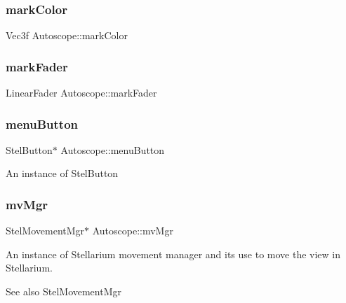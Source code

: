 \subsubsection{\texorpdfstring{markColor}{markColor}}
{\footnotesize\ttfamily Vec3f Autoscope\+::mark\+Color\hspace{0.3cm}{\ttfamily [private]}}

\mbox{\label{class_autoscope_a9c141894e06ed64f4131f1071e9e18af}} 
\subsubsection{\texorpdfstring{markFader}{markFader}}
{\footnotesize\ttfamily Linear\+Fader Autoscope\+::mark\+Fader\hspace{0.3cm}{\ttfamily [private]}}

\mbox{\label{class_autoscope_a5b14962697fbd8fffac986df08aee611}} 
\subsubsection{\texorpdfstring{menuButton}{menuButton}}
{\footnotesize\ttfamily Stel\+Button$\ast$ Autoscope\+::menu\+Button\hspace{0.3cm}{\ttfamily [private]}}

An instance of Stel\+Button \mbox{\label{class_autoscope_ab34124a1179a937ac061bb4fa3faa2de}} 
\subsubsection{\texorpdfstring{mvMgr}{mvMgr}}
{\footnotesize\ttfamily Stel\+Movement\+Mgr$\ast$ Autoscope\+::mv\+Mgr}



An instance of Stellarium movement manager and it\textquotesingle{}s use to move the view in Stellarium. 

\begin{DoxySeeAlso}{See also}
Stel\+Movement\+Mgr 
\end{DoxySeeAlso}
\mbox{\label{class_autoscope_aa02f096fc07e27ef3843eb4f8ba2c5a5}} 
